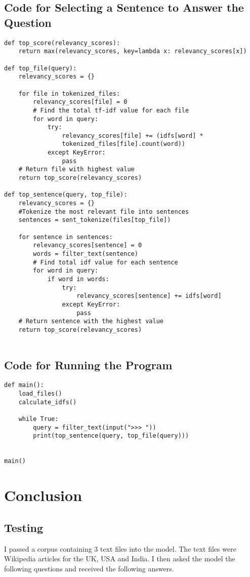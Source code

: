 \documentclass{article}
\begin{document}
\subsection{Code for Selecting a Sentence to Answer the Question}
\begin{verbatim}
def top_score(relevancy_scores):
	return max(relevancy_scores, key=lambda x: relevancy_scores[x])

def top_file(query):
	relevancy_scores = {}

	for file in tokenized_files:
		relevancy_scores[file] = 0
		# Find the total tf-idf value for each file
		for word in query:
			try:
				relevancy_scores[file] += (idfs[word] * 
				tokenized_files[file].count(word))
			except KeyError:
				pass
	# Return file with highest value
	return top_score(relevancy_scores)

def top_sentence(query, top_file):
	relevancy_scores = {}
	#Tokenize the most relevant file into sentences
	sentences = sent_tokenize(files[top_file])

	for sentence in sentences:
		relevancy_scores[sentence] = 0
		words = filter_text(sentence)
		# Find total idf value for each sentence
		for word in query:
			if word in words:
				try:
					relevancy_scores[sentence] += idfs[word]
				except KeyError:
					pass
	# Return sentence with the highest value
	return top_score(relevancy_scores)


\end{verbatim}

\subsection{Code for Running the Program}
\begin{verbatim}
def main():
	load_files()
	calculate_idfs()
	
	while True:
		query = filter_text(input(">>> "))
		print(top_sentence(query, top_file(query)))
	

main()
\end{verbatim}
\section{Conclusion}
\subsection{Testing}
I passed a corpus containing 3 text files into the model. The text files were Wikipedia articles for the UK, USA and India. I then asked the model the following questions and received the following answers.
\end{document}
